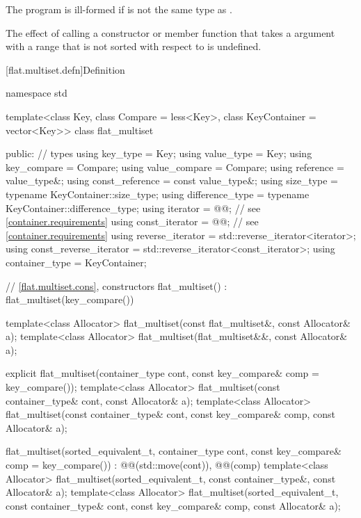 \pnum
The program is ill-formed if  is not the same type
as .

\pnum
The effect of calling a constructor or member function
that takes a  argument with a range
that is not sorted with respect to  is undefined.

[flat.multiset.defn]{Definition}

\begin{codeblock}
namespace std {
  template<class Key, class Compare = less<Key>, class KeyContainer = vector<Key>>
  class flat_multiset {
  public:
    // types
    using key_type                  = Key;
    using value_type                = Key;
    using key_compare               = Compare;
    using value_compare             = Compare;
    using reference                 = value_type&;
    using const_reference           = const value_type&;
    using size_type                 = typename KeyContainer::size_type;
    using difference_type           = typename KeyContainer::difference_type;
    using iterator                  = @@;  // see \ref{container.requirements}
    using const_iterator            = @@;  // see \ref{container.requirements}
    using reverse_iterator          = std::reverse_iterator<iterator>;
    using const_reverse_iterator    = std::reverse_iterator<const_iterator>;
    using container_type            = KeyContainer;

    // \ref{flat.multiset.cons}, constructors
    flat_multiset() : flat_multiset(key_compare()) { }

    template<class Allocator>
      flat_multiset(const flat_multiset&, const Allocator& a);
    template<class Allocator>
      flat_multiset(flat_multiset&&, const Allocator& a);

    explicit flat_multiset(container_type cont, const key_compare& comp = key_compare());
    template<class Allocator>
      flat_multiset(const container_type& cont, const Allocator& a);
    template<class Allocator>
      flat_multiset(const container_type& cont, const key_compare& comp, const Allocator& a);

    flat_multiset(sorted_equivalent_t, container_type cont,
                  const key_compare& comp = key_compare())
      : @@(std::move(cont)), @@(comp) { }
    template<class Allocator>
      flat_multiset(sorted_equivalent_t, const container_type&, const Allocator& a);
    template<class Allocator>
      flat_multiset(sorted_equivalent_t, const container_type& cont,
                    const key_compare& comp, const Allocator& a);

}}
\end{codeblock}
